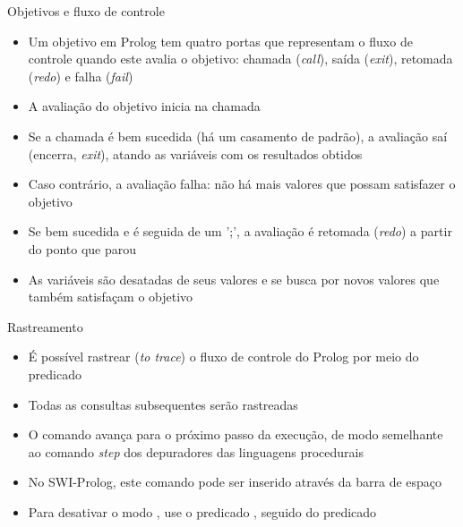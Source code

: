 \begin{frame}[fragile]{Objetivos e fluxo de controle}

    \begin{itemize}
        \item Um objetivo em Prolog tem quatro portas que representam o fluxo de controle
            quando este avalia o objetivo: chamada 
            (\textit{call}), saída (\textit{exit}), retomada (\textit{redo}) e falha 
            (\textit{fail})

        \item A avaliação do objetivo inicia na chamada

        \item Se a chamada é bem sucedida (há um casamento de padrão), a avaliação saí 
            (encerra, \textit{exit}), atando as variáveis com os resultados obtidos

        \item Caso contrário, a avaliação falha: não há mais valores que possam satisfazer o 
            objetivo

        \item Se bem sucedida e é seguida de um ';', a avaliação é retomada (\textit{redo}) a
            partir do ponto que parou 

        \item As variáveis são desatadas de seus valores e se busca por novos valores que 
            também satisfaçam o objetivo
    \end{itemize}

\end{frame}



\begin{frame}[fragile]{Rastreamento}

    \begin{itemize}
        \item É possível rastrear (\textit{to trace}) o fluxo de controle do Prolog por meio
            do predicado 

        \item Todas as consultas subsequentes serão rastreadas

        \item O comando  avança para o próximo passo da execução, de modo
            semelhante ao comando \textit{step} dos depuradores das linguagens procedurais

        \item No SWI-Prolog, este comando pode ser inserido através da barra de espaço

        \item Para desativar o modo , use o predicado 
            , seguido do predicado 

    \end{itemize}

\end{frame}


